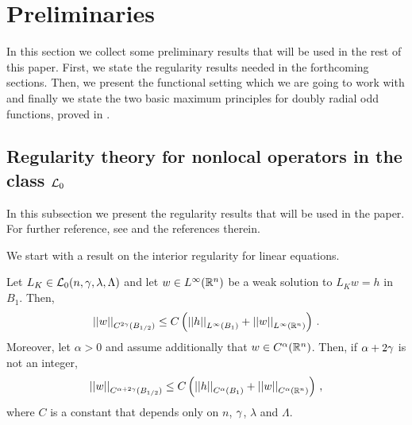 \section{Preliminaries}
\label{Sec:Preliminaries}

In this section we collect some preliminary results that will be used in the rest of this paper. First, we state the regularity results needed in the forthcoming sections. Then, we present the functional setting which we are going to work with and finally we state the two basic maximum principles for doubly radial odd functions, proved in \cite{FelipeSanz-Perela:IntegroDifferentialI}.


\subsection{Regularity theory for nonlocal operators in the class $\mathcal{L}_0$}
\label{Subsec:Regularity}


In this subsection we present the regularity results that will be used in the paper. For further reference, see \cite{RosOton-Survey,SerraC2s+alphaRegularity} and the references therein. 


We start with a result on the interior regularity for linear equations.

\begin{proposition}
	\label{Prop:InteriorRegularity}
	Let $L_K \in\mathcal{L}_0(n,\gamma,\lambda, \Lambda)$ and let $w\in L^\infty (\mathbb{R}^n)$ be a weak solution to $L_K w = h$ in $B_1$. Then,
	\begin{equation}
	\label{Eq:C2sEstimate}
	\left | \left |{w} \right | \right |_{C^{2\gamma} (B_{1/2})} \leq C\left ( {\left | \left |{h} \right | \right |_{L^\infty (B_1)} + \left | \left |{w} \right | \right |_{L^\infty  (\mathbb{R}^n)} }\right )\,.
	\end{equation}
	Moreover, let $\alpha > 0$ and assume additionally that $w \in C^\alpha (\mathbb{R}^n)$. Then, if $\alpha +
	2\gamma$ is not an integer,
	\begin{equation}
	\label{Eq:Calpha->Calpha+2sEstimate}
	\left | \left |{w} \right | \right |_{C^{\alpha + 2\gamma} (B_{1/2})} \leq C\left ( {\left | \left |{h} \right | \right |_{C^{\alpha} (B_1)} + \left | \left |{w} \right | \right |_{C^\alpha (\mathbb{R}^n)} }\right )\,,
	\end{equation}
	where $C$ is a constant that depends only on $n$, $\gamma$, $\lambda$ and $\Lambda$.
\end{proposition}


